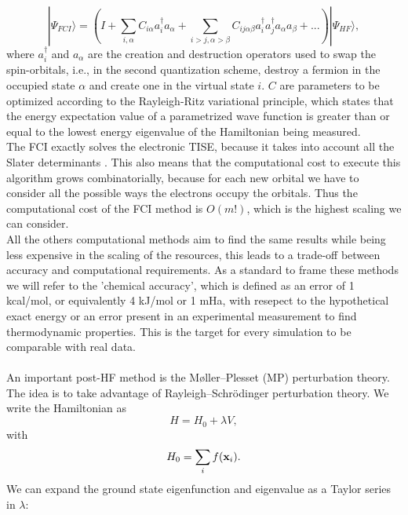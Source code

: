 \begin{equation}
    |\Psi_{FCI}\rangle = (I + \sum_{i,\alpha} C_{i\alpha} a^\dagger_i a_\alpha
                        + \sum_{i>j,\alpha>\beta} C_{ij\alpha\beta} a^\dagger_i a^\dagger_j a_\alpha a_\beta
                        + ...) |\Psi_{HF}\rangle,
\end{equation}
where $a^\dagger_i$ and $a_\alpha$ are the creation and destruction operators used to swap the spin-orbitals, i.e., in the second quantization scheme, destroy a fermion in the occupied state $\alpha$ and create one in the virtual state $i$. $C$ are parameters to be optimized according to the Rayleigh-Ritz variational principle, which states that the energy expectation value of a parametrized wave function is greater than or equal to the lowest energy eigenvalue of the Hamiltonian being measured. \\
The FCI exactly solves the electronic TISE, because it takes into account all the Slater determinants \cite{Cao2019Oct}. This also means that the computational cost to execute this algorithm grows combinatorially, because for each new orbital we have to consider all the possible ways the electrons occupy the orbitals. Thus the computational cost of the FCI method is $O(m!)$, which is the highest scaling we can consider. \\
All the others computational methods aim to find the same results while being less expensive in the scaling of the resources, this leads to a trade-off between accuracy and computational requirements. As a standard to frame these methods we will refer to the 'chemical accuracy', which is defined as an error of 1 kcal/mol, or equivalently 4 kJ/mol or 1 mHa, with resepect to the hypothetical exact energy or an error present in an experimental measurement to find thermodynamic properties. This is the target for every simulation to be comparable with real data. \\
\\
An important post-HF method is the Møller–Plesset (MP) perturbation theory. \\
The idea is to take advantage of Rayleigh–Schrödinger perturbation theory. We write the Hamiltonian as
\begin{equation}
    H = H_0 + \lambda V,
\end{equation}
with
\begin{equation}
    H_0 = \sum_i f({\bf x}_i).
\end{equation}
We can expand the ground state eigenfunction and eigenvalue as a Taylor series in $\lambda$:
